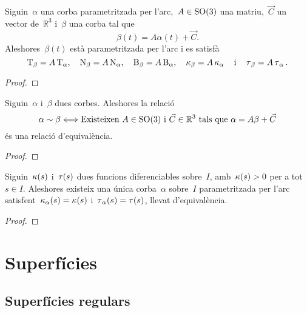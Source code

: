 \documentclass[../../main.tex]{subfiles}
\begin{document}
    \begin{corollary}
        \label{cor:una corba parametritzada per l'arc i la seva imatge per una aplicació que conserva les distàncies són equivalents}
        Siguin~\(\alpha\) una corba parametritzada per l'arc,~\(A\in\operatorname{SO}(3)\) una matriu,~\(\vec{C}\) un vector de~\(\mathbb{R}^{3}\) i~\(\beta\) una corba tal que
        \[
            \beta(t)=A\alpha(t)+\vec{C}.
        \]
        Aleshores~\(\beta(t)\) està parametritzada per l'arc i es satisfà
        \[
            \operatorname{T}_{\beta}=A\operatorname{T}_{\alpha},\quad\operatorname{N}_{\beta}=A\operatorname{N}_{\alpha},\quad\operatorname{B}_{\beta}=A\operatorname{B}_{\alpha},\quad\operatorname{\kappa}_{\beta}=A\operatorname{\kappa}_{\alpha}\quad\text{i}\quad\operatorname{\tau}_{\beta}=A\operatorname{\tau}_{\alpha}.
        \]
    \end{corollary}
    \begin{proof}
    \end{proof}
    \begin{lemma}
        \label{lemma:Teorema Fonamental de la teoria local de corbes}
        Siguin~\(\alpha\) i~\(\beta\) dues corbes.
        Aleshores la relació
        \[
            \alpha\sim\beta \Longleftrightarrow \text{Existeixen }A\in\operatorname{SO}(3)\text{ i }\vec{C}\in\mathbb{R}^{3}\text{ tals que }\alpha=A\beta+\vec{C}
        \]
        és una relació d'equivalència.
    \end{lemma}
    \begin{proof}
    \end{proof}
    \begin{theorem}
        \label{thm:Teorema Fonamental de la teoria local del corbes}
        Siguin~\(\operatorname{\kappa}(s)\) i~\(\operatorname{\tau}(s)\) dues funcions diferenciables sobre~\(I\), amb~\(\operatorname{\kappa}(s)>0\) per a tot~\(s\in I\).
        Aleshores existeix una única corba~\(\alpha\) sobre~\(I\) parametritzada per l'arc satisfent~\(\operatorname{\kappa}_{\alpha}(s)=\operatorname{\kappa}(s)\) i~\(\operatorname{\tau}_{\alpha}(s)=\operatorname{\tau}(s)\), llevat d'equivalència.
    \end{theorem}
    \begin{proof}
    \end{proof}
\chapter{Superfícies}
\section{Superfícies regulars}
\end{document}
